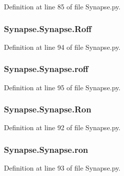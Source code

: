Definition at line 85 of file Synapse.\-py.

\hypertarget{class_synapse_1_1_synapse_ae67ffbbd23cd9c56f20bda9e8e040663}{
\subsubsection[{Roff}]{\setlength{\rightskip}{0pt plus 5cm}Synapse.\-Synapse.\-Roff}}\label{class_synapse_1_1_synapse_ae67ffbbd23cd9c56f20bda9e8e040663}


Definition at line 94 of file Synapse.\-py.

\hypertarget{class_synapse_1_1_synapse_a9a8d45c76378fae50d7ed2af29602aa8}{
\subsubsection[{roff}]{\setlength{\rightskip}{0pt plus 5cm}Synapse.\-Synapse.\-roff}}\label{class_synapse_1_1_synapse_a9a8d45c76378fae50d7ed2af29602aa8}


Definition at line 95 of file Synapse.\-py.

\hypertarget{class_synapse_1_1_synapse_ae759c51a7196995510fe3eb086050c76}{
\subsubsection[{Ron}]{\setlength{\rightskip}{0pt plus 5cm}Synapse.\-Synapse.\-Ron}}\label{class_synapse_1_1_synapse_ae759c51a7196995510fe3eb086050c76}


Definition at line 92 of file Synapse.\-py.

\hypertarget{class_synapse_1_1_synapse_a2e4a3427e071a311ac52341ad67f90c6}{
\subsubsection[{ron}]{\setlength{\rightskip}{0pt plus 5cm}Synapse.\-Synapse.\-ron}}\label{class_synapse_1_1_synapse_a2e4a3427e071a311ac52341ad67f90c6}


Definition at line 93 of file Synapse.\-py.

